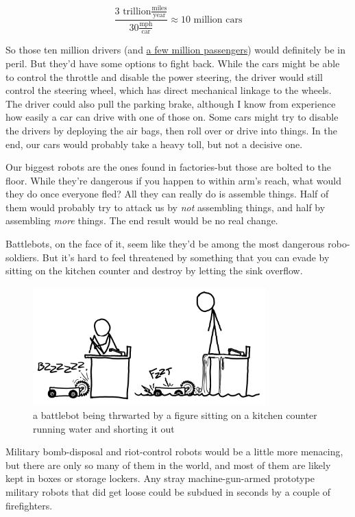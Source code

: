 {\[\frac{3\text{ trillion}\frac{\mathrm{miles}}{\mathrm{year}}}{30\frac{\mathrm{mph}}{\text{car}}}\approx10\text{ million cars}\]}

{So those ten million drivers (and \href{http://www.mtc.ca.gov/maps\_and\_data/datamart/forecast/ass98\_tab8.htm}{a few million passengers}) would definitely be in peril. But they’d have some options to fight back. While the cars might be able to control the throttle and disable the power steering, the driver would still control the steering wheel, which has direct mechanical linkage to the wheels. The driver could also pull the parking brake, although I know from experience how easily a car can drive with one of those on. Some cars might try to disable the drivers by deploying the air bags, then roll over or drive into things. In the end, our cars would probably take a heavy toll, but not a decisive one.}

{Our biggest robots are the ones found in factories-but those are bolted to the floor. While they're dangerous if you happen to within arm’s reach, what would they do once everyone fled? All they can really do is assemble things. Half of them would probably try to attack us by \emph{not} assembling things, and half by assembling \emph{more} things. The end result would be no real change.}

{Battlebots, on the face of it, seem like they’d be among the most dangerous robo-soldiers. But it’s hard to feel threatened by something that you can evade by sitting on the kitchen counter and destroy by letting the sink overflow.}

\begin{figure}[!htbp]
\centering
\includegraphics[scale=0.5, max width=0.8\textwidth]{imgs/a/5/robot_apocalypse_battlebot.png}
\caption{a battlebot being thrwarted by a figure sitting on a kitchen counter running water and shorting it out}
\end{figure}

{Military bomb-disposal and riot-control robots would be a little more menacing, but there are only so many of them in the world, and most of them are likely kept in boxes or storage lockers. Any stray machine-gun-armed prototype military robots that did get loose could be subdued in seconds by a couple of firefighters.}

